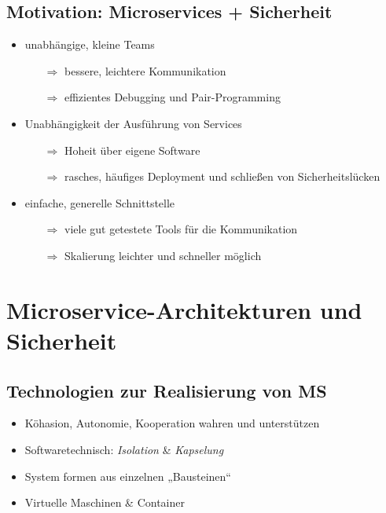 \documentclass{beamer}
\begin{document}
\subsection{Motivation: Microservices + Sicherheit}
\begin{frame}{\insertsubsection}
	\begin{itemize}
		\item unabhängige, kleine Teams
		\begin{itemize}
			\item[$\Rightarrow$] bessere, leichtere Kommunikation
			\item[$\Rightarrow$] effizientes Debugging und Pair-Programming
		\end{itemize}
		\item Unabhängigkeit der Ausführung von Services
		\begin{itemize}
			\item[$\Rightarrow$] Hoheit über eigene Software
			\item[$\Rightarrow$] rasches, häufiges Deployment und schließen von Sicherheitslücken
		\end{itemize}
		\item einfache, generelle Schnittstelle
		\begin{itemize}
			\item[$\Rightarrow$] viele gut getestete Tools für die Kommunikation
			\item[$\Rightarrow$] Skalierung leichter und schneller möglich
		\end{itemize}
	\end{itemize}
\end{frame}

	
\section{Microservice-Architekturen und Sicherheit}

\subsection{Technologien zur Realisierung von MS}
\begin{frame}{\insertsubsection}
	\begin{itemize}
		\setlength\itemsep{2em}
		\item Köhasion, Autonomie, Kooperation wahren und unterstützen
		\item Softwaretechnisch: \textit{Isolation} \& \textit{Kapselung}
		\item System formen aus einzelnen „Bausteinen“
		\item Virtuelle Maschinen \& Container
	\end{itemize}
\end{frame}
\end{document}
